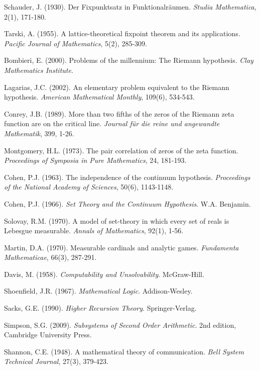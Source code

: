 \documentclass[12pt]{article}
\theoremstyle{plain}
\theoremstyle{definition}
\begin{document}
\begin{thebibliography}{99}
 Schauder, J. (1930). Der Fixpunktsatz in Funktionalräumen. \emph{Studia Mathematica}, 2(1), 171-180.

 Tarski, A. (1955). A lattice-theoretical fixpoint theorem and its applications. \emph{Pacific Journal of Mathematics}, 5(2), 285-309.

 Bombieri, E. (2000). Problems of the millennium: The Riemann hypothesis. \emph{Clay Mathematics Institute}.

 Lagarias, J.C. (2002). An elementary problem equivalent to the Riemann hypothesis. \emph{American Mathematical Monthly}, 109(6), 534-543.

 Conrey, J.B. (1989). More than two fifths of the zeros of the Riemann zeta function are on the critical line. \emph{Journal für die reine und angewandte Mathematik}, 399, 1-26.

 Montgomery, H.L. (1973). The pair correlation of zeros of the zeta function. \emph{Proceedings of Symposia in Pure Mathematics}, 24, 181-193.

 Cohen, P.J. (1963). The independence of the continuum hypothesis. \emph{Proceedings of the National Academy of Sciences}, 50(6), 1143-1148.

 Cohen, P.J. (1966). \emph{Set Theory and the Continuum Hypothesis}. W.A. Benjamin.

 Solovay, R.M. (1970). A model of set-theory in which every set of reals is Lebesgue measurable. \emph{Annals of Mathematics}, 92(1), 1-56.

 Martin, D.A. (1970). Measurable cardinals and analytic games. \emph{Fundamenta Mathematicae}, 66(3), 287-291.

 Davis, M. (1958). \emph{Computability and Unsolvability}. McGraw-Hill.

 Shoenfield, J.R. (1967). \emph{Mathematical Logic}. Addison-Wesley.

 Sacks, G.E. (1990). \emph{Higher Recursion Theory}. Springer-Verlag.

 Simpson, S.G. (2009). \emph{Subsystems of Second Order Arithmetic}. 2nd edition, Cambridge University Press.

 Shannon, C.E. (1948). A mathematical theory of communication. \emph{Bell System Technical Journal}, 27(3), 379-423.


\end{thebibliography}
\end{document}
